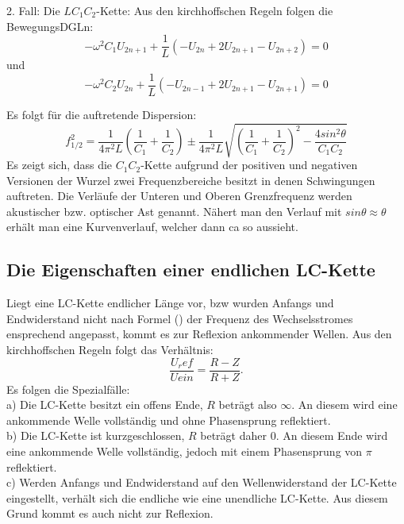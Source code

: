  2. Fall: Die $LC_1C_2$-Kette:
 Aus den kirchhoffschen Regeln folgen die BewegungsDGLn:
 \begin{equation}
   -\omega^2 C_1 U_{2n+1} + \frac{1}{L} \left( -U_{2n} + 2U_{2n+1} - U_{2n+2} \right) = 0
 \end{equation}
 und
 \begin{equation}
   -\omega^2 C_2 U_{2n} + \frac{1}{L} \left( -U_{2n-1} + 2U_{2n+1} - U_{2n+1} \right) = 0
 \end{equation}

Es folgt für die auftretende Dispersion:
\begin{equation}
  f_{1/2}^2 = \frac{1}{4\pi^2L}\left(\frac{1}{C_1}+\frac{1}{C_2}\right) \pm \frac{1}{4\pi^2L}\sqrt{\left(\frac{1}{C_1}+\frac{1}{C_2} \right)^2 - \frac{4 sin^2\theta}{C_1C_2}}
\end{equation}
Es zeigt sich, dass die $C_1C_2$-Kette aufgrund der positiven und negativen Versionen der Wurzel
zwei Frequenzbereiche besitzt in denen Schwingungen auftreten. Die Verläufe der Unteren und Oberen
 Grenzfrequenz werden akustischer bzw. optischer Ast genannt. Nähert man den Verlauf mit $sin \theta \approx \theta$ erhält man eine Kurvenverlauf, welcher dann ca so aussieht.


\subsection{Die Eigenschaften einer endlichen LC-Kette}
Liegt eine LC-Kette endlicher Länge vor, bzw wurden Anfangs und Endwiderstand
 nicht nach Formel () der Frequenz des Wechselsstromes ensprechend angepasst,
  kommt es zur Reflexion ankommender Wellen. Aus den kirchhoffschen Regeln folgt das Verhältnis:
  \begin{equation}
    \frac{U_ref}{Uein} = \frac{R-Z}{R+Z}\text{.}
  \end{equation}
  Es folgen die Spezialfälle:\\
  a) Die LC-Kette besitzt ein offens Ende, $R$ beträgt also $\infty$. An diesem
   wird eine ankommende Welle vollständig und ohne Phasensprung reflektiert.\\

  b) Die LC-Kette ist kurzgeschlossen, $R$ beträgt daher 0. An diesem Ende wird
   eine ankommende Welle vollständig, jedoch mit einem Phasensprung von $\pi$ reflektiert.\\

 c) Werden Anfangs und Endwiderstand auf den Wellenwiderstand der LC-Kette eingestellt, verhält
  sich die endliche wie eine unendliche LC-Kette. Aus diesem Grund kommt es auch nicht zur Reflexion.
